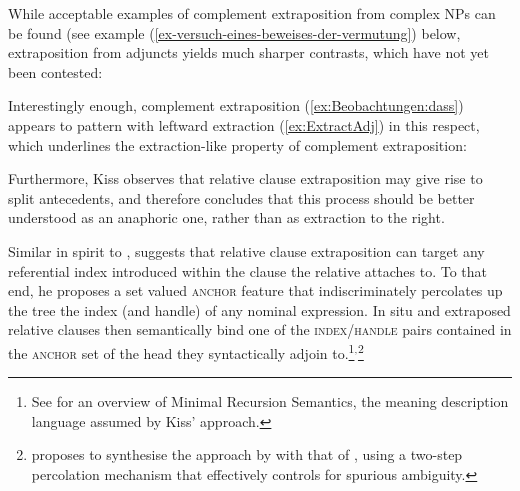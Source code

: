 \documentclass[output=paper
,notxmath 
	        ,collection
	        ,collectionchapter
 	        ,biblatex
                ,babelshorthands
                ,newtxmath
                ,draftmode
                ,colorlinks, citecolor=brown
]{langscibook}
\begin{document}
While acceptable examples of complement extraposition
from complex NPs can be found (see example
(\ref{ex-versuch-eines-beweises-der-vermutung}) below, extraposition
from adjuncts yields much sharper contrasts, which have not yet been
contested:

\eal
\label{ex:ExtraAdj}
\zl


Interestingly enough, complement extraposition (\ref{ex:Beobachtungen:dass}) appears to pattern with
leftward extraction (\ref{ex:ExtractAdj}) in this respect, which underlines the
extraction-like property of complement extraposition:

\z

Furthermore, Kiss observes that relative clause extraposition may give
rise to split antecedents, and therefore concludes that this process
should be better understood as an anaphoric one, rather than as
extraction to the right. 

Similar in spirit to \citet{culicover90:_extrap_and_compl_princ},
\citet{kiss_t02nllt} suggests that relative clause extraposition can
target any referential index introduced within the clause the relative
attaches to.  To that end, he proposes a set valued \textsc{anchor}
feature that indiscriminately percolates up the tree the index (and
handle) of any nominal expression. In situ and extraposed relative
clauses then semantically bind one of the \textsc{index/handle} pairs
contained in the \textsc{anchor} set of the head they syntactically
adjoin to.\footnote{See
  for an overview of Minimal Recursion Semantics, the meaning
  description language assumed by Kiss'
  approach.}$^,$\footnote{\citet{crysmann_b04rlc} proposes to
  synthesise the approach by \citet{kiss_t02nllt} with that of
  \citet{Keller:95}, using a two-step percolation mechanism that
  effectively controls for spurious ambiguity.}
\end{document}
